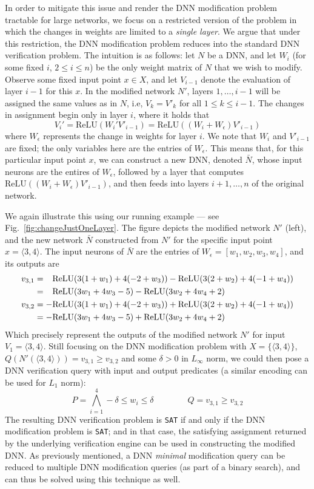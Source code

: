 \documentclass{easychair}
\newcommand{\relu}{\text{ReLU}\xspace{}}
\newcommand{\sat}{\texttt{SAT}}
\begin{document}
In order to mitigate this issue and render the DNN modification
problem tractable 
for large networks, we focus on a restricted version of
the problem in which the changes in weights are
limited to a \emph{single layer}. We argue that under this
restriction, the DNN modification problem reduces into the standard DNN
verification problem. The intuition is as follows: let $N$ be a DNN,
and let $W_i$ (for some fixed $i$, $2\leq i\leq n$) be the only weight matrix of $N$ that
we wish to modify. Observe some fixed input point $x\in X$, and let
$V_{i-1}$ denote the evaluation of layer $i-1$ for this $x$. In the
modified network $N'$, layers $1,\ldots,i-1$ will be assigned the same
values as in $N$, i.e, $V_k=V'_k$ for all $1\leq k\leq i-1$. The
changes in assignment begin only in layer $i$, where it holds that
\[
  V_i' = \relu{}(W_i'V'_{i-1}) = \relu{}((W_i+W_\epsilon)V'_{i-1})
\]
where $W_\epsilon$ represents the change in weights for layer $i$. We note that
$W_i$ and $V'_{i-1}$ are fixed; the only variables here are the
entries of $W_\epsilon$. This means that, for this particular input
point $x$,  we can construct a new DNN,
denoted $\bar{N}$, whose input neurons are the entires of $W_\epsilon$,
followed by a layer that computes $\relu{}((W_i+W_\epsilon)V'_{i-1})$,
and then feeds into layers $i+1,\ldots,n$ of the original network.

We again illustrate this using our running example --- see
Fig.~\ref{fig:changeJustOneLayer}. The figure depicts the modified
network $N'$ (left), and the new network $\bar{N}$ constructed from
$N'$ for the specific input point $x=\langle 3,4\rangle$.
The input neurons of
$\bar{N}$ are the entries of
$W_\epsilon=[w_1,w_2,w_3,w_4]$, and its outputs are
\begin{align*}
  v_{3,1}&= {\color{white}+}\relu{}(3(1+w_1)+4(-2+w_3))
    -
    \relu{}(3(2+w_2)+4(-1+w_4))
  \\
        &= {\color{white}+}\relu{}(3w_1+4w_3-5)
    -
       \relu{}(3w_2 + 4w_4 +2)
       \\
  v_{3,2}&= -\relu{}(3(1+w_1)+4(-2+w_3))
    +
           \relu{}(3(2+w_2)+4(-1+w_4))
  \\
        &= -\relu{}(3w_1+4w_3-5)
    +
    \relu{}(3w_2+4w_4+2)
\end{align*}
Which precisely represent the outputs of the modified network $N'$ for input
$V_1=\langle 3,4 \rangle$. Still focusing on the DNN modification
problem with $X=\{\langle 3, 4\rangle\}$, $Q(N'(\langle
3,4\rangle))=v_{3,1}\geq v_{3,2}$ and some $\delta> 0$ in $L_\infty$
norm, we could then pose a DNN verification query with input and
output predicates (a similar encoding can be used for $L_1$ norm):
\[
  P = \bigwedge_{i=1}^4-\delta \leq w_i \leq \delta \qquad \qquad Q = v_{3,1}\geq v_{3,2}
\]
The resulting DNN verification problem is \sat{} if and only if the DNN
modification problem is \sat{}; and in that case, the satisfying
assignment returned by the underlying verification engine can be used
in constructing the modified DNN. As previously mentioned, a DNN
\emph{minimal} modification query can be reduced to multiple DNN
modification queries (as part of a binary search), and can thus be
solved using this technique as well.
\end{document}
